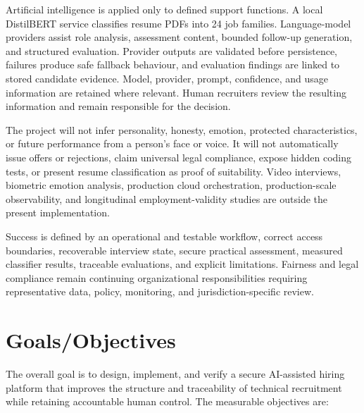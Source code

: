 \documentclass[12pt,a4paper,oneside]{report}
\begin{document}
Artificial intelligence is applied only to defined support functions. A local
DistilBERT service classifies resume PDFs into 24 job families. Language-model providers
assist role analysis, assessment content, bounded follow-up generation, and structured
evaluation. Provider outputs are validated before persistence, failures produce safe
fallback behaviour, and evaluation findings are linked to stored candidate evidence.
Model, provider, prompt, confidence, and usage information are retained where relevant.
Human recruiters review the resulting information and remain responsible for the
decision.

The project will not infer personality, honesty, emotion, protected characteristics,
or future performance from a person's face or voice. It will not automatically issue
offers or rejections, claim universal legal compliance, expose hidden coding tests, or
present resume classification as proof of suitability. Video interviews, biometric
emotion analysis, production cloud orchestration, production-scale observability, and
longitudinal employment-validity studies are outside the present implementation.

Success is defined by an operational and testable workflow, correct access boundaries,
recoverable interview state, secure practical assessment, measured classifier results,
traceable evaluations, and explicit limitations. Fairness and legal compliance remain
continuing organizational responsibilities requiring representative data, policy,
monitoring, and jurisdiction-specific review.

\clearpage
\section{Goals/Objectives}

The overall goal is to design, implement, and verify a secure AI-assisted hiring
platform that improves the structure and traceability of technical recruitment while
retaining accountable human control. The measurable objectives are:
\end{document}
